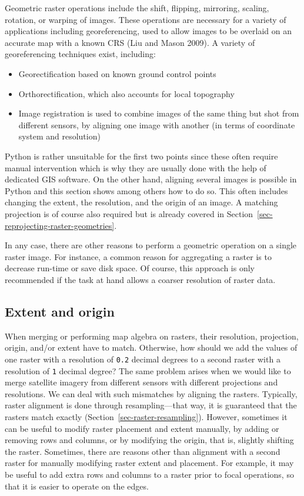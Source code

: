 \documentclass[
  letterpaper,
]{krantz}
\providecommand{\tightlist}{%
  \setlength{\itemsep}{0pt}\setlength{\parskip}{0pt}}\usepackage{longtable,booktabs,array}
\begin{document}
Geometric raster operations include the shift, flipping, mirroring,
scaling, rotation, or warping of images. These operations are necessary
for a variety of applications including georeferencing, used to allow
images to be overlaid on an accurate map with a known CRS (Liu and Mason
2009). A variety of georeferencing techniques exist, including:

\begin{itemize}
\tightlist
\item
  Georectification based on known ground control points
\item
  Orthorectification, which also accounts for local topography
\item
  Image registration is used to combine images of the same thing but
  shot from different sensors, by aligning one image with another (in
  terms of coordinate system and resolution)
\end{itemize}

Python is rather unsuitable for the first two points since these often
require manual intervention which is why they are usually done with the
help of dedicated GIS software. On the other hand, aligning several
images is possible in Python and this section shows among others how to
do so. This often includes changing the extent, the resolution, and the
origin of an image. A matching projection is of course also required but
is already covered in Section~\ref{sec-reprojecting-raster-geometries}.

In any case, there are other reasons to perform a geometric operation on
a single raster image. For instance, a common reason for aggregating a
raster is to decrease run-time or save disk space. Of course, this
approach is only recommended if the task at hand allows a coarser
resolution of raster data.

\subsection{Extent and origin}\label{sec-extent-and-origin}

When merging or performing map algebra on rasters, their resolution,
projection, origin, and/or extent have to match. Otherwise, how should
we add the values of one raster with a resolution of \texttt{0.2}
decimal degrees to a second raster with a resolution of \texttt{1}
decimal degree? The same problem arises when we would like to merge
satellite imagery from different sensors with different projections and
resolutions. We can deal with such mismatches by aligning the rasters.
Typically, raster alignment is done through resampling---that way, it is
guaranteed that the rasters match exactly
(Section~\ref{sec-raster-resampling}). However, sometimes it can be
useful to modify raster placement and extent manually, by adding or
removing rows and columns, or by modifying the origin, that is, slightly
shifting the raster. Sometimes, there are reasons other than alignment
with a second raster for manually modifying raster extent and placement.
For example, it may be useful to add extra rows and columns to a raster
prior to focal operations, so that it is easier to operate on the edges.
\end{document}
